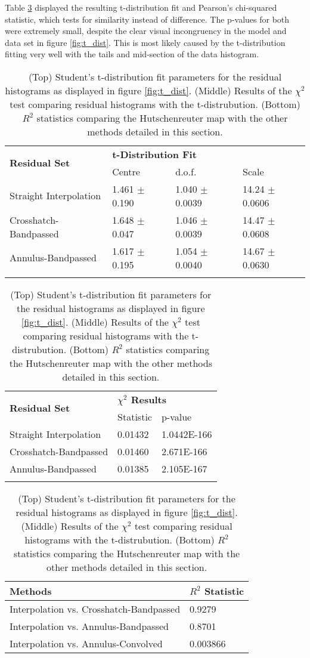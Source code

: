 Table \ref{tab:fr_stats} displayed the resulting t-distribution fit and Pearson's chi-squared statistic, which tests for similarity instead of difference. The p-values for both were extremely small, despite the clear visual incongruency in the model and data set in figure \ref{fig:t_dist}. This is most likely caused by the t-distribution fitting very well with the tails and mid-section of the data histogram.

\begin{table}
    \centering
    \begin{tabular}{l l l l}
        \hline
        \multirow{2}{*}{\bfseries{Residual Set}} & \multicolumn{3}{l}{\bfseries{t-Distribution Fit}} \\
        & Centre & d.o.f. & Scale \\
        \hline
        Straight Interpolation & 1.461 $\pm$ 0.190 & 1.040 $\pm$ 0.0039 & 14.24 $\pm$ 0.0606 \\
        Crosshatch-Bandpassed & 1.648 $\pm$ 0.047 & 1.046 $\pm$ 0.0039 & 14.47 $\pm$ 0.0608 \\
        Annulus-Bandpassed & 1.617 $\pm$ 0.195 & 1.054 $\pm$ 0.0040 & 14.67 $\pm$ 0.0630 \\
        \hline
        & & & \\
    \end{tabular}
    \begin{tabular}{l l l}
        \hline
        \multirow{2}{*}{\bfseries{Residual Set}} & \multicolumn{2}{l}{\bfseries{$\chi^2$ Results}} \\
        & Statistic & p-value \\
        \hline
        Straight Interpolation & 0.01432 & 1.0442E-166 \\
        Crosshatch-Bandpassed & 0.01460 & 2.671E-166 \\
        Annulus-Bandpassed & 0.01385 & 2.105E-167 \\
        \hline
        & & \\
    \end{tabular}
    \begin{tabular}{l l}
        \hline
        \bfseries{Methods} & \bfseries{$R^2$ Statistic} \\
        \hline
        Interpolation vs. Crosshatch-Bandpassed & 0.9279 \\
        Interpolation vs. Annulus-Bandpassed & 0.8701 \\
        Interpolation vs. Annulus-Convolved & 0.003866 \\
        \hline
    \end{tabular}
    \caption{(Top) Student's t-distribution fit parameters for the residual histograms as displayed in figure \ref{fig:t_dist}. (Middle) Results of the $\chi^2$ test comparing residual histograms with the t-distrubution. (Bottom) $R^2$ statistics comparing the Hutschenreuter map with the other methods detailed in this section.}
    \label{tab:fr_stats}
\end{table}

